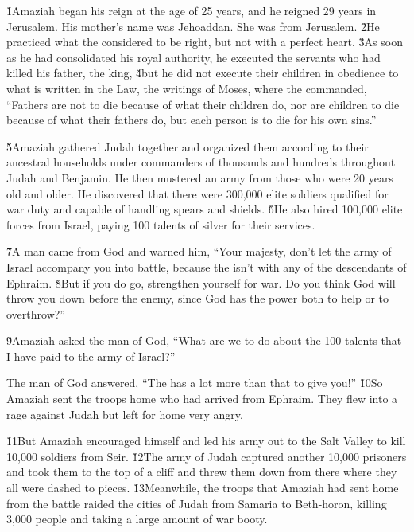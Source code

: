 \v{1}Amaziah began his reign at the age of 25 years, and he reigned 29 years in Jerusalem. His mother's name was Jehoaddan. She was from Jerusalem. \v{2}He practiced what the  considered to be right, but not with a perfect heart. \v{3}As soon as he had consolidated his royal authority, he executed the servants who had killed his father, the king, \v{4}but he did not execute their children in obedience to what is written in the Law, the writings of Moses, where the  commanded, ``Fathers are not to die because of what their children do, nor are children to die because of what their fathers do, but each person is to die for his own sins.''

\v{5}Amaziah gathered Judah together and organized them according to their ancestral households under commanders of thousands and hundreds throughout Judah and Benjamin. He then mustered an army from those who were 20 years old and older. He discovered that there were 300,000 elite soldiers qualified for war duty and capable of handling spears and shields. \v{6}He also hired 100,000 elite forces from Israel, paying 100 talents of silver for their services.

\v{7}A man came from God and warned him, ``Your majesty, don't let the army of Israel accompany you into battle, because the  isn't with any of the descendants of Ephraim. \v{8}But if you do go, strengthen yourself for war. Do you think God will throw you down before the enemy, since God has the power both to help or to overthrow?''

\v{9}Amaziah asked the man of God, ``What are we to do about the 100 talents that I have paid to the army of Israel?''

The man of God answered, ``The  has a lot more than that to give you!'' \v{10}So Amaziah sent the troops home who had arrived from Ephraim. They flew into a rage against Judah but left for home very angry.

\v{11}But Amaziah encouraged himself and led his army out to the Salt Valley to kill 10,000 soldiers from Seir. \v{12}The army of Judah captured another 10,000 prisoners and took them to the top of a cliff and threw them down from there where they all were dashed to pieces. \v{13}Meanwhile, the troops that Amaziah had sent home from the battle raided the cities of Judah from Samaria to Beth-horon, killing 3,000 people and taking a large amount of war booty.

